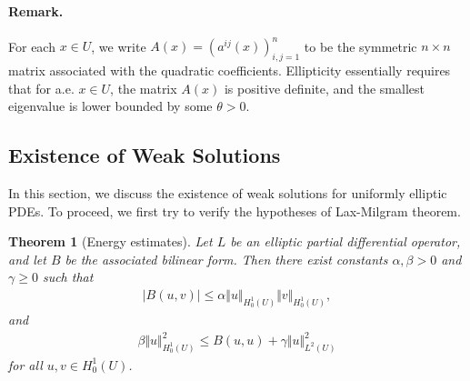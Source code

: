 \documentclass{article}
\numberwithin{equation}{section}
\theoremstyle{plain}
\newtheorem{theorem}{Theorem}[section]
\theoremstyle{definition}
\begin{document}
\paragraph{Remark.} For each $x\in U$, we write $A(x)=(a^{ij}(x))_{i,j=1}^n$ to be the symmetric $n\times n$ matrix associated with the quadratic coefficients. Ellipticity essentially requires that for a.e. $x\in U$, the matrix $A(x)$ is positive definite, and the smallest eigenvalue is lower bounded by some $\theta>0$.

\newpage
\subsection{Existence of Weak Solutions}
In this section, we discuss the existence of weak solutions for uniformly elliptic PDEs. To proceed, we first try to verify the hypotheses of Lax-Milgram theorem.
\begin{theorem}[Energy estimates]\label{energyest}
Let $L$ be an elliptic partial differential operator, and let $B$ be the associated bilinear form. Then there exist constants $\alpha,\beta>0$ and $\gamma\geq 0$ such that
\begin{align}
	\vert B(u,v)\vert\leq\alpha\Vert u\Vert_{H_0^1(U)}\Vert v\Vert_{H_0^1(U)},\label{energybounded}
\end{align}
and
\begin{align}
	\beta\Vert u\Vert_{H_0^1(U)}^2\leq B(u,u)+\gamma\Vert u\Vert_{L^2(U)}^2\label{energycoercive}
\end{align}
for all $u,v\in H_0^1(U)$.
\end{theorem}
\end{document}
